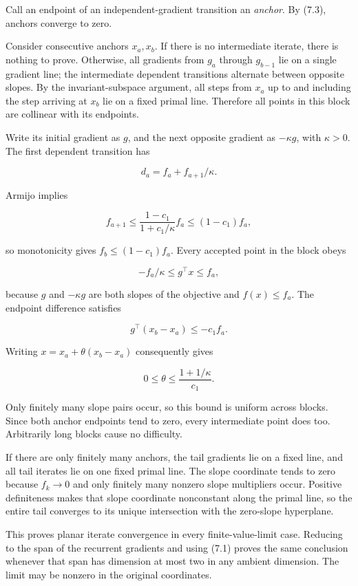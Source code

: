 \documentclass[10pt,oneside,openany]{book}
\theoremstyle{remark}\newtheorem{remark}{Remark}[chapter]
\begin{document}
Call an endpoint of an independent-gradient transition an \emph{anchor}.
By (7.3), anchors converge to zero.

Consider consecutive anchors \(x_a,x_b\). If there is no intermediate
iterate, there is nothing to prove. Otherwise, all gradients from
\(g_a\) through \(g_{b-1}\) lie on a single gradient line; the
intermediate dependent transitions alternate between opposite slopes. By
the invariant-subspace argument, all steps from \(x_a\) up to and
including the step arriving at \(x_b\) lie on a fixed primal line.
Therefore all points in this block are collinear with its endpoints.

Write its initial gradient as \(g\), and the next opposite gradient as
\(-\kappa g\), with \(\kappa>0\). The first dependent transition has

\[
d_a=f_a+f_{a+1}/\kappa.
\]

Armijo implies

\[
f_{a+1}\le\frac{1-c_1}{1+c_1/\kappa}f_a
\le(1-c_1)f_a,
\]

so monotonicity gives \(f_b\le(1-c_1)f_a\). Every accepted point in the
block obeys

\[
-f_a/\kappa\le g^\top x\le f_a,
\]

because \(g\) and \(-\kappa g\) are both slopes of the objective and
\(f(x)\le f_a\). The endpoint difference satisfies

\[
g^\top(x_b-x_a)\le-c_1 f_a.
\]

Writing \(x=x_a+\theta(x_b-x_a)\) consequently gives

\[
0\le\theta\le\frac{1+1/\kappa}{c_1}.
\]

Only finitely many slope pairs occur, so this bound is uniform across
blocks. Since both anchor endpoints tend to zero, every intermediate
point does too. Arbitrarily long blocks cause no difficulty.

If there are only finitely many anchors, the tail gradients lie on a
fixed line, and all tail iterates lie on one fixed primal line. The
slope coordinate tends to zero because \(f_k\to0\) and only finitely
many nonzero slope multipliers occur. Positive definiteness makes that
slope coordinate nonconstant along the primal line, so the entire tail
converges to its unique intersection with the zero-slope hyperplane.

This proves planar iterate convergence in every finite-value-limit case.
Reducing to the span of the recurrent gradients and using (7.1) proves
the same conclusion whenever that span has dimension at most two in any
ambient dimension. The limit may be nonzero in the original coordinates.
\end{document}
